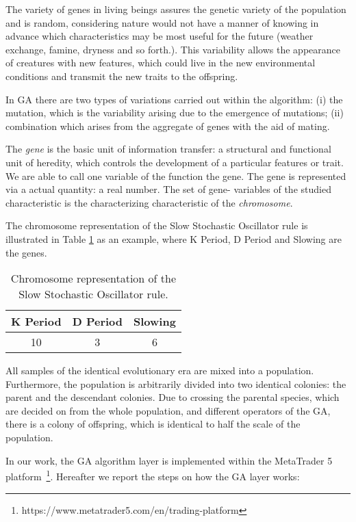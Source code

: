 The variety of genes in living beings assures the genetic variety of the population and is random, considering nature would not have a manner of knowing in advance which characteristics may be most useful for the future (weather exchange, famine, dryness and so forth.). This variability allows the appearance of creatures with new features, which could live in the new environmental conditions and transmit the new traits to the offspring.

In GA there are two types of variations carried out within the algorithm: (i) the mutation, which is the variability arising due to the emergence of mutations; (ii) combination which arises from the aggregate of genes with the aid of mating.

The \textit{gene} is the basic unit of information transfer: a structural and functional unit of heredity, which controls the development of a particular features or trait. We are able to call one variable of the function the gene. The gene is represented via a actual quantity: a real number. The set of gene- variables of the studied characteristic is the characterizing characteristic of the \textit{chromosome}.

The chromosome representation of the  Slow Stochastic Oscillator rule is illustrated in Table \ref{tab:Chromosome} as an example, where K Period, D Period and Slowing are the genes.

\begin{center}
\begin{table}[htb]
\centering
\begin{tabular}{|c|c|c|}
\hline 
K Period & D Period & Slowing \\ 
\hline 
10 & 3 & 6 \\ 
\hline 
\end{tabular} 
\caption{\label{tab:Chromosome}Chromosome representation of the  Slow Stochastic Oscillator rule.}
\end{table}
\end{center}


All samples of the identical evolutionary era are mixed into a population. Furthermore, the population is arbitrarily divided into two identical colonies: the parent and the descendant colonies. Due to crossing the parental species, which are decided on from the whole population, and different operators of the GA, there is a colony of offspring, which is identical to half the scale of the population.

In our work, the GA algorithm layer is implemented within the MetaTrader 5 platform~\footnote{https://www.metatrader5.com/en/trading-platform}.
Hereafter we report the steps on how the GA layer works:

